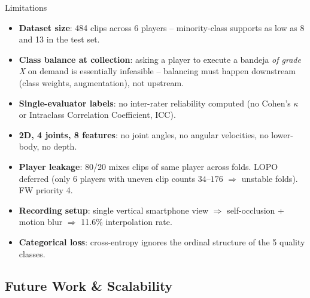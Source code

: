 \begin{frame}{Limitations}
\hypertarget{sub:limitations}{}%
\begin{itemize}\small
    \item \textbf{Dataset size}: 484 clips across 6 players -- minority-class supports as low as 8 and 13 in the test set.
    \item \textbf{Class balance at collection}: asking a player to execute a bandeja \emph{of grade X} on demand is essentially infeasible -- balancing must happen downstream (class weights, augmentation), not upstream.
    \item \textbf{Single-evaluator labels}: no inter-rater reliability computed (no Cohen's $\kappa$ or Intraclass Correlation Coefficient, ICC).
    \item \textbf{2D, 4 joints, 8 features}: no joint angles, no angular velocities, no lower-body, no depth.
    \item \textbf{Player leakage}: 80/20 mixes clips of same player across folds. LOPO deferred (only 6 players with uneven clip counts $34$--$176$ $\Rightarrow$ unstable folds). FW priority 4.
    \item \textbf{Recording setup}: single vertical smartphone view $\Rightarrow$ self-occlusion + motion blur $\Rightarrow$ 11.6\% interpolation rate.
    \item \textbf{Categorical loss}: cross-entropy ignores the ordinal structure of the 5 quality classes.
\end{itemize}
\end{frame}

\subsection{Future Work \& Scalability}

